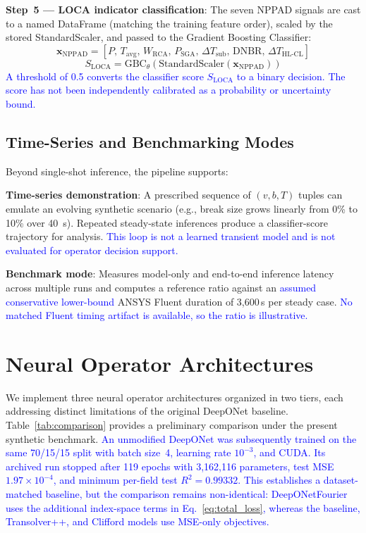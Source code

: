 \documentclass[journal]{IEEEtran}
\newcommand{\added}[1]{\textcolor{blue}{#1}}
\begin{document}
\textbf{Step~5 --- LOCA indicator classification}: The seven NPPAD signals are cast to a named DataFrame (matching the training feature order), scaled by the stored StandardScaler, and passed to the Gradient Boosting Classifier:
\begin{equation}
\bm{x}_{\text{NPPAD}} =
\left[
P,\,
T_{\text{avg}},\,
W_{\text{RCA}},\,
P_{\text{SGA}},\,
\Delta T_{\text{sub}},\,
\mathrm{DNBR},\,
\Delta T_{\text{HL-CL}}
\right]
\end{equation}
\begin{equation}
S_{\mathrm{LOCA}} =
\mathrm{GBC}_{\theta}\!\left(
\mathrm{StandardScaler}\!\left(\bm{x}_{\text{NPPAD}}\right)
\right)
\end{equation}
 \added{A threshold of 0.5 converts the classifier score $S_{\mathrm{LOCA}}$ to a binary decision. The score has not been independently calibrated as a probability or uncertainty bound.}

\subsection{Time-Series and Benchmarking Modes}

Beyond single-shot inference, the pipeline supports:

\textbf{Time-series demonstration}: A prescribed sequence of $(v,b,T)$ tuples can emulate an evolving synthetic scenario (e.g., break size grows linearly from 0\% to 10\% over 40~s). Repeated steady-state inferences produce a classifier-score trajectory for analysis. \added{This loop is not a learned transient model and is not evaluated for operator decision support.}

\textbf{Benchmark mode}: Measures model-only and end-to-end inference latency across multiple runs and computes a reference ratio against an \added{assumed conservative lower-bound} ANSYS Fluent duration of 3,600\,s per steady case.  \added{No matched Fluent timing artifact is available, so the ratio is illustrative.}

\section{Neural Operator Architectures}
\label{sec:architectures}

We implement three neural operator architectures organized in two tiers, each addressing distinct limitations of the original DeepONet baseline.
Table~\ref{tab:comparison} provides a preliminary comparison under the present synthetic benchmark.  \added{An unmodified DeepONet was subsequently trained on the same 70/15/15 split with batch size~4, learning rate $10^{-3}$, and CUDA. Its archived run stopped after 119 epochs with 3,162,116 parameters, test MSE $1.97\times10^{-4}$, and minimum per-field test $R^2=0.99332$. This establishes a dataset-matched baseline, but the comparison remains non-identical: DeepONetFourier uses the additional index-space terms in Eq.~\eqref{eq:total_loss}, whereas the baseline, Transolver++, and Clifford models use MSE-only objectives.}
\end{document}
